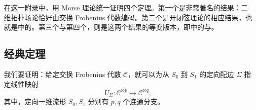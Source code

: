 在这一附录中，用 Morse 理论统一证明四个定理。第一个是非常著名的结果：二维拓扑场论恰好由交换 Frobenius 代数编码。第二个是开闭弦理论的相应结果，也就是中的。第三个与第四个，则是这两个结果的等变版本，即中的与。

\subsection{经典定理}\label{sec:2.7.1}

我们要证明：给定交换 Frobenius 代数 $\mathcal{C}$，就可以为从 $S_0$ 到 $S_1$ 的定向配边 $\Sigma$ 指定线性映射
\[
U_\Sigma\colon\mathcal{C}^{\otimes p}\longrightarrow\mathcal{C}^{\otimes q},
\]
其中，定向一维流形 $S_0,S_1$ 分别有 $p,q$ 个连通分支。

